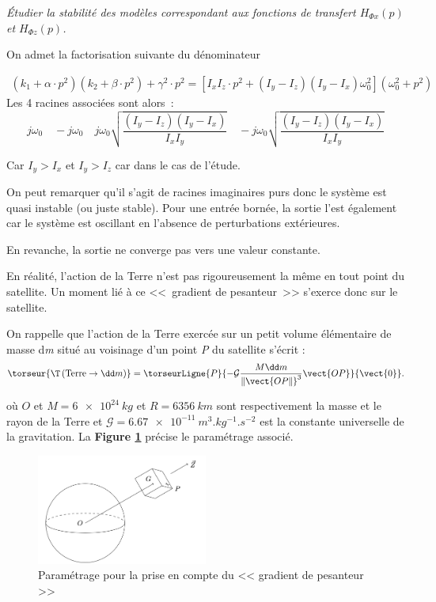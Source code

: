 \question{\label{q_10}}\textit{Étudier la stabilité des modèles correspondant aux fonctions de transfert $H_{\Phi x}(p)$ et $H_{\Phi z}(p)$.}
\ifprof
\begin{corrige}
On admet la factorisation suivante du dénominateur

\begin{align*}
\left(k_1+\alpha\cdot p^2\right)\left(k_2+\beta\cdot p^2\right)+\gamma^2\cdot p^2=\left[I_xI_z\cdot p^2+\left(I_y-I_z\right)\left(I_y-I_x\right)\omega_0^2\right]\left(\omega_0^2+p^2\right)
\end{align*}
%
%
Les 4 racines associées sont alors~: 
$$
j\omega_0
\quad
-j\omega_0
\quad
j\omega_0\sqrt{\dfrac{\left(I_y-I_z\right)\left(I_y-I_x\right)}{I_xI_y}}
\quad
-j\omega_0\sqrt{\dfrac{\left(I_y-I_z\right)\left(I_y-I_x\right)}{I_xI_y}}
$$


Car $I_y>I_x$ et $I_y>I_z$ car dans le cas de l'étude.

On peut remarquer qu'il s'agit de racines imaginaires purs donc le
système est quasi instable (ou juste stable). Pour une entrée bornée, la
sortie l'est également car le système est oscillant en l'absence de
perturbations extérieures.

En revanche, la sortie ne converge pas vers une valeur constante.

\end{corrige}
\else
\fi


\ifprof
\else
En réalité, l'action de la Terre n'est pas rigoureusement la même en
tout point du satellite. Un moment lié à ce <<~gradient de pesanteur~>> 
s'exerce donc sur le satellite.

On rappelle que l'action de la Terre exercée sur un petit volume
élémentaire de masse d\emph{m} situé au voisinage d'un point \emph{P} du
satellite s'écrit :
$$
\torseur{\T\left(\text{Terre}\to \dd m\right)}=\torseurLigne{P}{-\mathcal{G}\dfrac{M \dd m}{\Vert\vect{OP\Vert}^3}\vect{OP}}{\vect{0}}.
$$



où $O$ et $M = \SI{6e24}{kg}$ et $R = \SI{6356}{km}$
sont respectivement la masse et le rayon de la Terre et $\mathcal{G} =\SI{6,67e-11}{m^{3}.kg^{-1}.s^{-2}}$ est la
constante universelle de la gravitation. La \textbf{Figure \ref{fig5}} précise le paramétrage associé.


\begin{figure}[!htb]
\begin{center}
\includegraphics[width=0.5\textwidth]{images/images5.jpg}
\end{center}
\caption{Paramétrage pour la prise en compte du << gradient de pesanteur >> \label{fig5}}
\end{figure}

